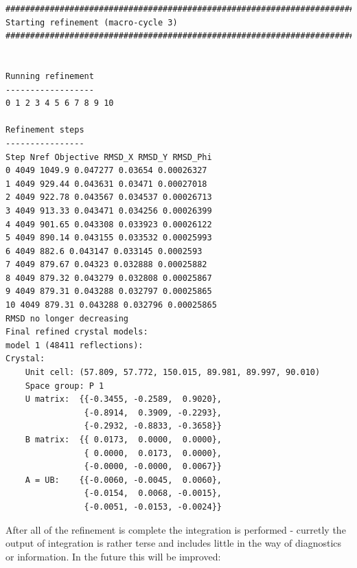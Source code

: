 \documentclass[a4paper, 11pt]{article}
\begin{document}
{\small
\begin{verbatim}
################################################################################
Starting refinement (macro-cycle 3)
################################################################################


Running refinement
------------------
0 1 2 3 4 5 6 7 8 9 10

Refinement steps
----------------
Step Nref Objective RMSD_X RMSD_Y RMSD_Phi
0 4049 1049.9 0.047277 0.03654 0.00026327 
1 4049 929.44 0.043631 0.03471 0.00027018 
2 4049 922.78 0.043567 0.034537 0.00026713 
3 4049 913.33 0.043471 0.034256 0.00026399 
4 4049 901.65 0.043308 0.033923 0.00026122 
5 4049 890.14 0.043155 0.033532 0.00025993 
6 4049 882.6 0.043147 0.033145 0.0002593 
7 4049 879.67 0.04323 0.032888 0.00025882 
8 4049 879.32 0.043279 0.032808 0.00025867 
9 4049 879.31 0.043288 0.032797 0.00025865 
10 4049 879.31 0.043288 0.032796 0.00025865 
RMSD no longer decreasing
Final refined crystal models:
model 1 (48411 reflections):
Crystal:
    Unit cell: (57.809, 57.772, 150.015, 89.981, 89.997, 90.010)
    Space group: P 1
    U matrix:  {{-0.3455, -0.2589,  0.9020},
                {-0.8914,  0.3909, -0.2293},
                {-0.2932, -0.8833, -0.3658}}
    B matrix:  {{ 0.0173,  0.0000,  0.0000},
                { 0.0000,  0.0173,  0.0000},
                {-0.0000, -0.0000,  0.0067}}
    A = UB:    {{-0.0060, -0.0045,  0.0060},
                {-0.0154,  0.0068, -0.0015},
                {-0.0051, -0.0153, -0.0024}}
\end{verbatim}
}

\noindent
After all of the refinement is complete the integration is performed -
curretly the output of integration is rather terse and includes little
in the way of diagnostics or information. In the future this will be improved:
\end{document}
